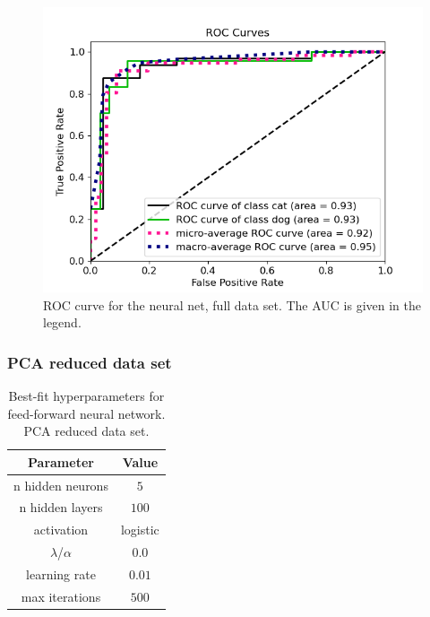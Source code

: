 \documentclass[a4paper]{article}
\begin{document}
\begin{figure}[H]
	\centering
	\includegraphics[scale=0.5]{../figures/neural_net/roc_nbins200_pca0_seed4155_ts0.20.png}
	\caption{ROC curve for the neural net, full data set. The AUC is given in the legend.}
	\label{fig:nn_roc_nonpca}
\end{figure}	


\subsubsection{PCA reduced data set}

\begin{table}[H]
  \centering
  \caption{Best-fit hyperparameters for feed-forward neural network. PCA reduced data set.}
  \label{tab:best_fit_nn_pca}
  \begin{tabular}{c|c}
    \hline\hline
    Parameter & Value\\\hline
    n hidden neurons &  $5$\\
    n hidden layers &  $100$\\
    activation & logistic \\
    $\lambda$/$\alpha$  & $0.0$\\
    learning rate & $0.01$ \\
    max iterations & $500$
    \end{tabular}
\end{table}
\end{document}

